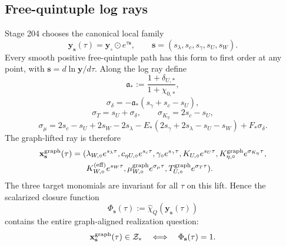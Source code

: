 \subsection{Free-quintuple log rays}
\label{subsec:app-part06-free-quintuple-log-rays}

Stage 204 chooses the canonical local family
\begin{equation}
\label{eq:app-part06-log-ray}
\mathbf y_{\mathbf s}(\tau)=\mathbf y_\circ\odot e^{\tau\mathbf s},
\qquad
\mathbf s=(s_\lambda,s_c,s_\gamma,s_U,s_W).
\end{equation}
Every smooth positive free-quintuple path has this form to first order at any point, with \(\mathbf s=d\ln\mathbf y/d\tau\).  Along the log ray define
\begin{equation}
\label{eq:app-part06-a-star}
\mathfrak a_*:=\frac{1+\delta_{U,*}}{1+\chi_{0,*}},
\end{equation}
\begin{equation}
\label{eq:app-part06-sigma-delta}
\sigma_\delta=-\mathfrak a_*(s_\gamma+s_c-s_U),
\end{equation}
\begin{equation}
\label{eq:app-part06-sigma-T-K}
\sigma_T=s_U+\sigma_\delta,
\qquad
\sigma_{K_\eta}=2s_c-s_U,
\end{equation}
\begin{equation}
\label{eq:app-part06-sigma-mu}
\sigma_\mu
=2s_c-s_U+2s_W-2s_\lambda
-E_*(2s_\gamma+2s_\lambda-s_U-s_W)
+F_*\sigma_\delta.
\end{equation}
The graph-lifted ray is therefore
\begin{equation}
\label{eq:app-part06-graph-lifted-ray}
\begin{aligned}
\mathbf x_{\mathbf s}^{\rm graph}(\tau)=
(&\lambda_{W,\circ}e^{s_\lambda\tau},
 c_{\eta U,\circ}e^{s_c\tau},
 \gamma_\circ e^{s_\gamma\tau},
 K_{U,\circ}e^{s_U\tau},
 K_{\eta,\circ}^{\rm graph}e^{\sigma_{K_\eta}\tau},\\
&K_{W,\circ}^{(\rm eff)}e^{s_W\tau},
 \mu_{W,\circ}^{\rm graph}e^{\sigma_\mu\tau},
 T_{U,\circ}^{\rm graph}e^{\sigma_T\tau}).
\end{aligned}
\end{equation}
The three target monomials are invariant for all \(\tau\) on this lift.  Hence the scalarized closure function
\begin{equation}
\label{eq:app-part06-Phi-ray-def}
\Phi_{\mathbf s}(\tau):=
\widehat\chi_Q(\mathbf y_{\mathbf s}(\tau))
\end{equation}
contains the entire graph-aligned realization question:
\begin{equation}
\label{eq:app-part06-ray-closure}
\mathbf x_{\mathbf s}^{\rm graph}(\tau)\in\mathcal Z_*
\quad\Longleftrightarrow\quad
\Phi_{\mathbf s}(\tau)=1.
\end{equation}

